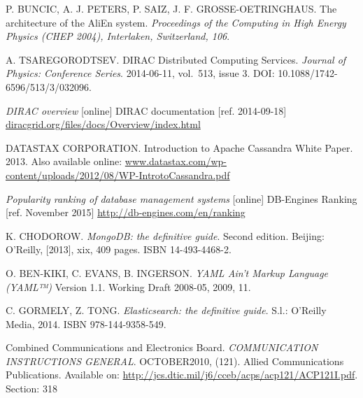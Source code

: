 \begin{thebibliography}{99}
	P. BUNCIC, A. J. PETERS, P. SAIZ, J. F. GROSSE-OETRINGHAUS. 
	The architecture of the AliEn system. 
	\textit{Proceedings of the Computing in High Energy Physics (CHEP 2004), 				
	Interlaken, Switzerland, 106}.
	
	A. TSAREGORODTSEV.
	DIRAC Distributed Computing Services. 
	\textit{Journal of Physics: Conference Series}. 2014-06-11, vol.~513, issue 3. 
	DOI: 10.1088/1742-6596/513/3/032096. 

	\emph{DIRAC overview} [online] 
	DIRAC documentation [ref. 2014-09-18]
	\url{diracgrid.org/files/docs/Overview/index.html}

	DATASTAX CORPORATION. 
	Introduction to Apache Cassandra White Paper. 2013.
	Also available online: \url{www.datastax.com/wp-content/uploads/2012/08/WP-IntrotoCassandra.pdf}
	
	\emph{Popularity ranking of database management systems} [online]
	DB-Engines Ranking [ref. November 2015]
	\url{http://db-engines.com/en/ranking} 
	
	K. CHODOROW. \textit{MongoDB: the definitive guide}. Second edition. 
	Beijing: O'Reilly, [2013], xix, 409 pages. ISBN 14-493-4468-2. 
	
	O. BEN-KIKI, C. EVANS, B. INGERSON. \textit{YAML Ain't Markup Language (YAML™)} 
	Version 1.1. Working Draft 2008-05, 2009, 11.	
	
	C. GORMELY, Z. TONG. \textit{Elasticsearch: the definitive guide}. S.l.: 
	O'Reilly Media, 2014. ISBN 978-144-9358-549. 
	
	Combined Communications and Electronics Board. 
	\textit{COMMUNICATION INSTRUCTIONS GENERAL}. OCTOBER2010, (121). 
	Allied Communications Publications. 
	Available on: \url{http://jcs.dtic.mil/j6/cceb/acps/acp121/ACP121I.pdf}.
	Section: 318
	
\end{thebibliography}